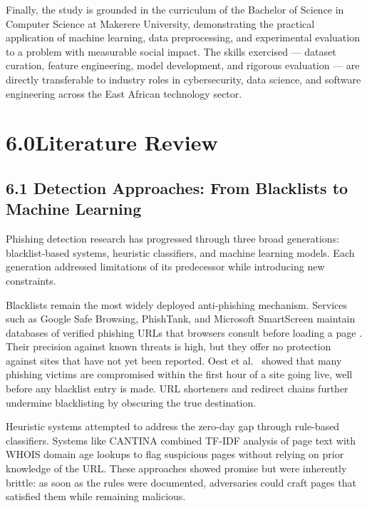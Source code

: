 \documentclass[11pt,letterpaper]{article}
\begin{document}
Finally, the study is grounded in the curriculum of the Bachelor of Science in Computer Science at Makerere University, demonstrating the practical application of machine learning, data preprocessing, and experimental evaluation to a problem with measurable social impact. The skills exercised --- dataset curation, feature engineering, model development, and rigorous evaluation --- are directly transferable to industry roles in cybersecurity, data science, and software engineering across the East African technology sector.

\newpage
\section*{6.0\quad Literature Review}

\subsection*{6.1 Detection Approaches: From Blacklists to Machine Learning}

Phishing detection research has progressed through three broad generations: blacklist-based systems, heuristic classifiers, and machine learning models. Each generation addressed limitations of its predecessor while introducing new constraints.

Blacklists remain the most widely deployed anti-phishing mechanism. Services such as Google Safe Browsing, PhishTank, and Microsoft SmartScreen maintain databases of verified phishing URLs that browsers consult before loading a page \cite{google_safebrowsing}. Their precision against known threats is high, but they offer no protection against sites that have not yet been reported. Oest et al.\ \cite{oest2020} showed that many phishing victims are compromised within the first hour of a site going live, well before any blacklist entry is made. URL shorteners and redirect chains further undermine blacklisting by obscuring the true destination.

Heuristic systems attempted to address the zero-day gap through rule-based classifiers. Systems like CANTINA combined TF-IDF analysis of page text with WHOIS domain age lookups to flag suspicious pages without relying on prior knowledge of the URL. These approaches showed promise but were inherently brittle: as soon as the rules were documented, adversaries could craft pages that satisfied them while remaining malicious.
\end{document}
